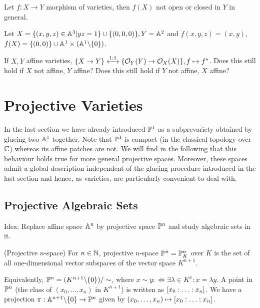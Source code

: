 \documentclass[a4paper,11pt]{article}
\begin{document}
{				\begin{remark}
					Let $f:X\rightarrow Y$ morphism of varieties, then $f(X)$ not open or closed in $Y$ in general.
				\end{remark}

				\begin{eg}
					Let $X=\{(x,y,z)\in\AA^3|yz=1\}\cup\{(0,0,0)\},Y=\AA^2$  and $f(x,y,z)=(x,y)$, $f(X)=\{(0,0)\}\cup\AA^1\times(\AA^1\backslash\{0\})$.
				\end{eg}

				\begin{exc}
					If $X,Y$ affine varieties, $\{X\rightarrow Y\}\overset{1:1}{\longleftrightarrow}\{\O_Y(Y)\rightarrow\O_X(X)\}, f\mapsto f^\ast$. Does this still hold if $X$ not affine, $Y$ affine? Does this still hold if $Y$ not affine, $X$ affine?
				\end{exc}

			}



	\section{Projective Varieties}

		In the last section we have already introduced $\P^1$ as a subprevariety obtained by glueing two $\AA^1$ together. Note that $\P^1$ is compact (in the classical topology over $\CC$) whereas its affine patches are not. We will find in the following that this behaviour holds true for more general projective spaces. Moreover, these spaces admit a global description independent of the glueing procedure introduced in the last section and hence, as varieties, are particularly convenient to deal with.


		\subsection{Projective Algebraic Sets}

			\noindent Idea: Replace affine space $\AA^n$ by projective space $\P^n$ and study algebraic sets in it.
			
			\begin{defi}(Projective $n$-space)
				For $n\in \N$, projective $n$-space $\P^n=\P^n_K$ over $K$ is the set of all one-dimensional vector subspaces of the vector space $K^{n+1}$.
			\end{defi}

			\begin{remark}
				Equivalently, $\P^n=(K^{n+1}\backslash\{0\})/\sim$, where $x\sim y:\Longleftrightarrow \exists\lambda\in K^x:x=\lambda y$. A point in $\P^n$ (the class of $(x_0,\dots,x_n)$ in $K^{n+1}$) is written as $\x{n}$. We have a projection $\pi:\AA^{n+1}\backslash\{0\}\rightarrow\P^n$ given by $(x_0,\dots,x_n)\mapsto\x{n}$.
			\end{remark}
\end{document}

